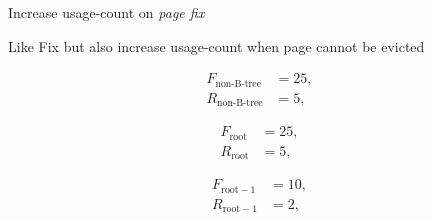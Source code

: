 \begin{frame}
    \begin{description}
        \item<2->[Fix]          Increase usage-count on \emph{page fix}
        \item<2->[FixFull]      Like \textcolor{structure}{Fix} but also increase usage-count when page cannot be evicted
    \end{description}
    \vspace{.5em}
    \begin{description}
        \item<3->[]     \noindent\begin{minipage}[t]{.225\linewidth}
                            \vspace{-2em}
                            \begin{align*}
                                F_{\text{non-B-tree}} &= 25,\\
                                R_{\text{non-B-tree}} &= 5,
                            \end{align*}
                        \end{minipage}%
                        \noindent\begin{minipage}[t]{.225\linewidth}
                            \vspace{-2em}
                            \begin{align*}
                                F_{\text{root}} &= 25,\\
                                R_{\text{root}} &= 5,
                            \end{align*}\break
                        \end{minipage}%
                        \noindent\begin{minipage}[t]{.225\linewidth}
                            \vspace{-2em}
                            \begin{align*}
                                F_{\text{root} - 1} &= 10,\\
                                R_{\text{root} - 1} &= 2,
                            \end{align*}\break
                        \end{minipage}%
                        \noindent\begin{minipage}[t]{.225\linewidth}
                            \vspace{-2em}
                            \begin{align*}

\end{align*}
\end{minipage}
\end{description}
\end{frame}
